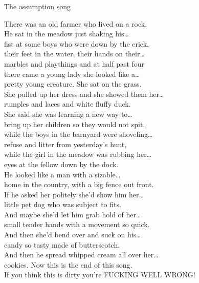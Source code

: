 \begin{song}{The assumption song}
	

	
	There was an old farmer who lived on a rock.\\
	\vspace{.2cm}
	He sat in the meadow just shaking his\ldots\\
	fist at some boys who were down by the crick,\\
	\vspace{.2cm}	
	their feet in the water, their hands on their\ldots\\
	marbles and playthings and at half past four\\
	\vspace{.2cm}
	there came a young lady she looked like a\ldots\\
	pretty young creature. She sat on the grass.\\
	\vspace{.2cm}
	She pulled up her dress and she showed them her\ldots\\
	rumples and laces and white fluffy duck.\\
	\vspace{.2cm}
	She said she was learning a new way to\ldots\\
	bring up her children so they would not spit,\\
	\vspace{.2cm}
	while the boys in the barnyard were shoveling\ldots\\
	refuse and litter from yesterday's hunt,\\
	\vspace{.2cm}
	while the girl in the meadow was rubbing her\ldots\\
	eyes at the fellow down by the dock.\\
	\vspace{.2cm}
	He looked like a man with a sizable\ldots\\
	home in the country, with a big fence out front.\\
	\vspace{.2cm}
	If he asked her politely she'd show him her\ldots\\
	little pet dog who was subject to fits.\\
	\vspace{.2cm}
	And maybe she'd let him grab hold of her\ldots\\
	small tender hands with a movement so quick.\\
	\vspace{.2cm}
	And then she'd bend over and suck on his\ldots\\
	candy so tasty made of butterscotch.\\
	\vspace{.2cm}
	And then he spread whipped cream all over her\ldots\\
	cookies. Now this is the end of this song.\\
	If you think this is dirty you're FUCKING WELL WRONG!
	
\end{song}
